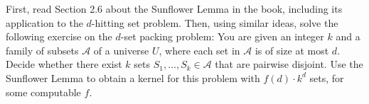 \documentclass[english]{uebung_cs}
\begin{document}
\begin{exercise} %
  First, read Section 2.6 about the Sunflower Lemma in the book, including its application to the $d$-hitting set problem.
  Then, using similar ideas, solve the following exercise on the $d$-set packing problem:
  You are given an integer $k$ and a family of subsets $\mathcal{A}$ of a universe $U$, where each set in $\mathcal{A}$ is of size at most $d$. Decide whether there exist $k$ sets $S_1,\ldots,S_k \in \mathcal{A}$ that are pairwise disjoint.
  Use the Sunflower Lemma to obtain a kernel for this problem with $f(d)\cdot k^d$ sets, for some computable $f$.
\end{exercise}
\end{document}
